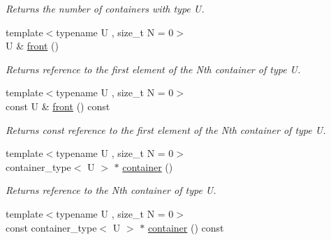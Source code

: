 \begin{DoxyCompactItemize}
\begin{DoxyCompactList}\small\item\em Returns the number of containers with type U. \end{DoxyCompactList}\item 
\hypertarget{classheterogeneous_1_1heteroforward__list_3_01_t_00_01_types_8_8_8_4_abb4f241b6809196ba817af82e5fa1a2b}{}{\footnotesize template$<$typename U , size\+\_\+t N = 0$>$ }\\U \& \hyperlink{classheterogeneous_1_1heteroforward__list_3_01_t_00_01_types_8_8_8_4_abb4f241b6809196ba817af82e5fa1a2b}{front} ()\label{classheterogeneous_1_1heteroforward__list_3_01_t_00_01_types_8_8_8_4_abb4f241b6809196ba817af82e5fa1a2b}

\begin{DoxyCompactList}\small\item\em Returns reference to the first element of the Nth container of type U. \end{DoxyCompactList}\item 
\hypertarget{classheterogeneous_1_1heteroforward__list_3_01_t_00_01_types_8_8_8_4_a460be2a5ff1285ff73ae2a0fbe0454cd}{}{\footnotesize template$<$typename U , size\+\_\+t N = 0$>$ }\\const U \& \hyperlink{classheterogeneous_1_1heteroforward__list_3_01_t_00_01_types_8_8_8_4_a460be2a5ff1285ff73ae2a0fbe0454cd}{front} () const \label{classheterogeneous_1_1heteroforward__list_3_01_t_00_01_types_8_8_8_4_a460be2a5ff1285ff73ae2a0fbe0454cd}

\begin{DoxyCompactList}\small\item\em Returns const reference to the first element of the Nth container of type U. \end{DoxyCompactList}\item 
\hypertarget{classheterogeneous_1_1heteroforward__list_3_01_t_00_01_types_8_8_8_4_a3fed5e9207bc25b8d05b1b75a7f47df4}{}{\footnotesize template$<$typename U , size\+\_\+t N = 0$>$ }\\container\+\_\+type$<$ U $>$ $\ast$ \hyperlink{classheterogeneous_1_1heteroforward__list_3_01_t_00_01_types_8_8_8_4_a3fed5e9207bc25b8d05b1b75a7f47df4}{container} ()\label{classheterogeneous_1_1heteroforward__list_3_01_t_00_01_types_8_8_8_4_a3fed5e9207bc25b8d05b1b75a7f47df4}

\begin{DoxyCompactList}\small\item\em Returns reference to the Nth container of type U. \end{DoxyCompactList}\item 
\hypertarget{classheterogeneous_1_1heteroforward__list_3_01_t_00_01_types_8_8_8_4_ae09f9e758b893c37c008fa6d64b7ff57}{}{\footnotesize template$<$typename U , size\+\_\+t N = 0$>$ }\\const container\+\_\+type$<$ U $>$ $\ast$ \hyperlink{classheterogeneous_1_1heteroforward__list_3_01_t_00_01_types_8_8_8_4_ae09f9e758b893c37c008fa6d64b7ff57}{container} () const \label{classheterogeneous_1_1heteroforward__list_3_01_t_00_01_types_8_8_8_4_ae09f9e758b893c37c008fa6d64b7ff57}


\end{DoxyCompactItemize}
